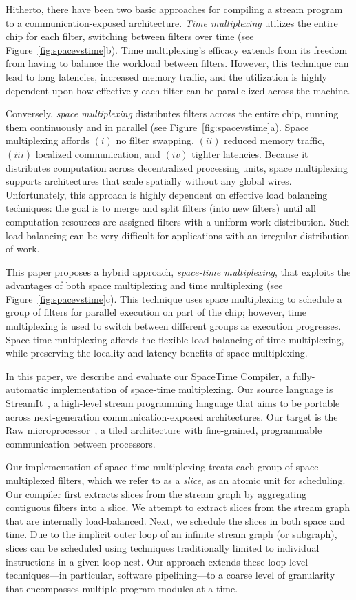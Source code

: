 Hitherto, there have been two basic approaches for compiling a stream
program to a communication-exposed architecture.  {\it Time
multiplexing} utilizes the entire chip for each filter, switching
between filters over time (see Figure~\ref{fig:spacevstime}b).  Time
multiplexing's efficacy extends from its freedom from having to
balance the workload between filters.  However, this technique can
lead to long latencies, increased memory traffic, and the utilization
is highly dependent upon how effectively each filter can be
parallelized across the machine.

Conversely, {\it space multiplexing} distributes filters across the
entire chip, running them continuously and in parallel (see
Figure~\ref{fig:spacevstime}a).  Space multiplexing affords $(i)$ no
filter swapping, $(ii)$ reduced memory traffic, $(iii)$ localized
communication, and $(iv)$ tighter latencies.  Because it distributes
computation across decentralized processing units, space multiplexing
supports architectures that scale spatially without any global wires.
Unfortunately, this approach is highly dependent on effective load
balancing techniques: the goal is to merge and split filters (into new
filters) until all computation resources are assigned filters with a
uniform work distribution.  Such load balancing can be very difficult
for applications with an irregular distribution of work.

This paper proposes a hybrid approach, {\it space-time multiplexing},
that exploits the advantages of both space multiplexing and time
multiplexing (see Figure~\ref{fig:spacevstime}c).  This technique uses
space multiplexing to schedule a group of filters for parallel
execution on part of the chip; however, time multiplexing is used to
switch between different groups as execution progresses.  Space-time
multiplexing affords the flexible load balancing of time multiplexing,
while preserving the locality and latency benefits of space
multiplexing.

In this paper, we describe and evaluate our SpaceTime Compiler, a
fully-automatic implementation of space-time multiplexing.  Our source
language is StreamIt~\cite{streamitcc}, a high-level stream
programming language that aims to be portable across next-generation
communication-exposed architectures.  Our target is the Raw
microprocessor~\cite{raw10,raw_isca}, a tiled architecture with
fine-grained, programmable communication between processors.

Our implementation of space-time multiplexing treats each group of
space-multiplexed filters, which we refer to as a {\it slice}, as an
atomic unit for scheduling. Our compiler first extracts slices from
the stream graph by aggregating contiguous filters into a slice. We
attempt to extract slices from the stream graph that are internally
load-balanced. Next, we schedule the slices in both space and time.
Due to the implicit outer loop of an infinite stream graph (or
subgraph), slices can be scheduled using techniques traditionally
limited to individual instructions in a given loop nest.  Our approach
extends these loop-level techniques---in particular, software
pipelining---to a coarse level of granularity that encompasses
multiple program modules at a time.

